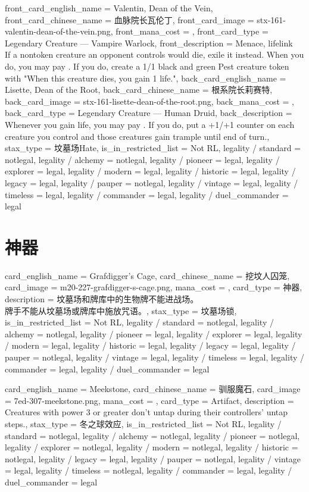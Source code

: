 \documentclass[lang = cn, color = black, 10pt]{AllThatStax}
\begin{document}
\mfcard
{
	front_card_english_name = {Valentin, Dean of the Vein},
	front_card_chinese_name = {血脉院长瓦伦丁},
	front_card_image = stx-161-valentin-dean-of-the-vein.png,
	front_mana_cost = ,
	front_card_type = Legendary Creature — Vampire Warlock,
	front_description = {Menace, lifelink\\
		If a nontoken creature an opponent controls would die, exile it instead. When you do, you may pay . If you do, create a 1/1 black and green Pest creature token with "When this creature dies, you gain 1 life."},
	back_card_english_name = {Lisette, Dean of the Root},
	back_card_chinese_name = {根系院长莉赛特},
	back_card_image = stx-161-lisette-dean-of-the-root.png,
	back_mana_cost = ,
	back_card_type = Legendary Creature — Human Druid,
	back_description = {Whenever you gain life, you may pay . If you do, put a +1/+1 counter on each creature you control and those creatures gain trample until end of turn.},
	stax_type = 坟墓场Hate,
	is_in_restricted_list = Not RL,
	legality / standard = notlegal,
	legality / alchemy = notlegal,
	legality / pioneer = legal,
	legality / explorer = legal,
	legality / modern = legal,
	legality / historic = legal,
	legality / legacy = legal,
	legality / pauper = notlegal,
	legality / vintage = legal,
	legality / timeless = legal,
	legality / commander = legal,
	legality / duel_commander = legal
}

\section{神器}

\card
{
	card_english_name = {Grafdigger's Cage},
	card_chinese_name = {挖坟人囚笼},
	card_image = m20-227-grafdigger-s-cage.png,
	mana_cost = ,
	card_type = 神器,
	description = {坟墓场和牌库中的生物牌不能进战场。\\
		牌手不能从坟墓场或牌库中施放咒语。},
	stax_type = 坟墓场锁,
	is_in_restricted_list = Not RL,
	legality / standard = notlegal,
	legality / alchemy = notlegal,
	legality / pioneer = legal,
	legality / explorer = legal,
	legality / modern = legal,
	legality / historic = legal,
	legality / legacy = legal,
	legality / pauper = notlegal,
	legality / vintage = legal,
	legality / timeless = legal,
	legality / commander = legal,
	legality / duel_commander = legal
}

\card
{
	card_english_name = {Meekstone},
	card_chinese_name = {驯服魔石},
	card_image = 7ed-307-meekstone.png,
	mana_cost = ,
	card_type = Artifact,
	description = {Creatures with power 3 or greater don't untap during their controllers' untap steps.},
	stax_type = 冬之球效应,
	is_in_restricted_list = Not RL,
	legality / standard = notlegal,
	legality / alchemy = notlegal,
	legality / pioneer = notlegal,
	legality / explorer = notlegal,
	legality / modern = notlegal,
	legality / historic = notlegal,
	legality / legacy = legal,
	legality / pauper = notlegal,
	legality / vintage = legal,
	legality / timeless = notlegal,
	legality / commander = legal,
	legality / duel_commander = legal
}
\end{document}
